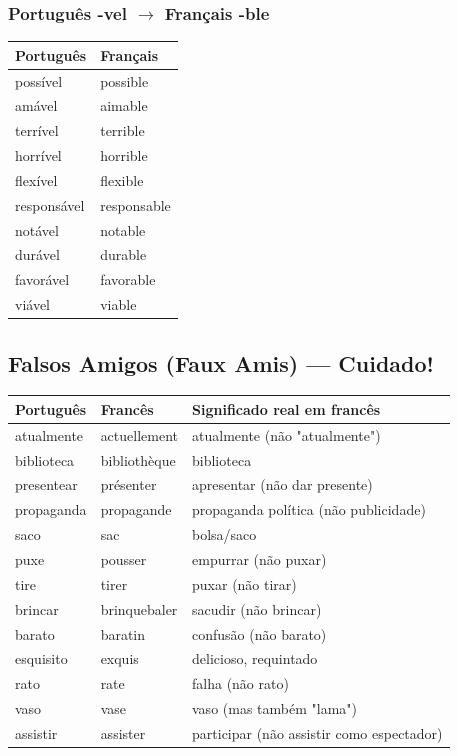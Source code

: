 \documentclass[a4paper,12pt]{article}
\begin{document}
\subsubsection{Português -vel $\to$ Français -ble}
\begin{tabular}{ll}
    \toprule
    Português & Français \\
    \midrule
    possível & possible \\
    amável & aimable \\
    terrível & terrible \\
    horrível & horrible \\
    flexível & flexible \\
    responsável & responsable \\
    notável & notable \\
    durável & durable \\
    favorável & favorable \\
    viável & viable \\
    \bottomrule
\end{tabular}

\subsection{Falsos Amigos (Faux Amis) — Cuidado!}
\begin{tabular}{lll}
    \toprule
    Português & Francês & Significado real em francês \\
    \midrule
    atualmente & actuellement & atualmente (não "atualmente") \\
    biblioteca & bibliothèque & biblioteca \\
    presentear & présenter & apresentar (não dar presente) \\
    propaganda & propagande & propaganda política (não publicidade) \\
    saco & sac & bolsa/saco \\
    puxe & pousser & empurrar (não puxar) \\
    tire & tirer & puxar (não tirar) \\
    brincar & brinquebaler & sacudir (não brincar) \\
    barato & baratin & confusão (não barato) \\
    esquisito & exquis & delicioso, requintado \\
    rato & rate & falha (não rato) \\
    vaso & vase & vaso (mas também "lama") \\
    assistir & assister & participar (não assistir como espectador) \\
    \bottomrule
\end{tabular}
\end{document}
